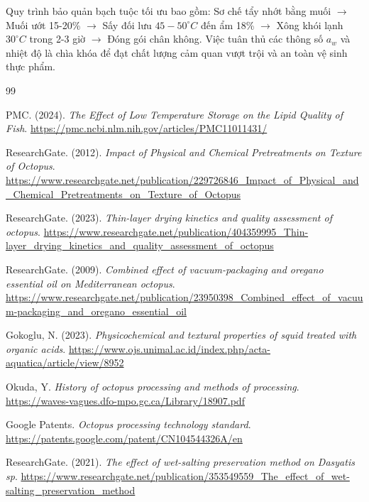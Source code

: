 \documentclass[12pt,a4paper]{report}
\begin{document}
Quy trình bảo quản bạch tuộc tối ưu bao gồm: Sơ chế tẩy nhớt bằng muối $\rightarrow$ Muối ướt 15-20\% $\rightarrow$ Sấy đối lưu $45-50^\circ C$ đến ẩm 18\% $\rightarrow$ Xông khói lạnh $30^\circ C$ trong 2-3 giờ $\rightarrow$ Đóng gói chân không. Việc tuân thủ các thông số $a_w$ và nhiệt độ là chìa khóa để đạt chất lượng cảm quan vượt trội và an toàn vệ sinh thực phẩm.

\newpage
\renewcommand{\bibname}{Tài liệu tham khảo}
\begin{thebibliography}{99}
	
	 PMC. (2024). \textit{The Effect of Low Temperature Storage on the Lipid Quality of Fish}. \url{https://pmc.ncbi.nlm.nih.gov/articles/PMC11011431/}
	
	 ResearchGate. (2012). \textit{Impact of Physical and Chemical Pretreatments on Texture of Octopus}. \url{https://www.researchgate.net/publication/229726846_Impact_of_Physical_and_Chemical_Pretreatments_on_Texture_of_Octopus}
	
	 ResearchGate. (2023). \textit{Thin-layer drying kinetics and quality assessment of octopus}. \url{https://www.researchgate.net/publication/404359995_Thin-layer_drying_kinetics_and_quality_assessment_of_octopus}
	
	 ResearchGate. (2009). \textit{Combined effect of vacuum-packaging and oregano essential oil on Mediterranean octopus}. \url{https://www.researchgate.net/publication/23950398_Combined_effect_of_vacuum-packaging_and_oregano_essential_oil}
	
	 Gokoglu, N. (2023). \textit{Physicochemical and textural properties of squid treated with organic acids}. \url{https://www.ojs.unimal.ac.id/index.php/acta-aquatica/article/view/8952}
	
	 Okuda, Y. \textit{History of octopus processing and methods of processing}. \url{https://waves-vagues.dfo-mpo.gc.ca/Library/18907.pdf}
	
	 Google Patents. \textit{Octopus processing technology standard}. \url{https://patents.google.com/patent/CN104544326A/en}
	
	 ResearchGate. (2021). \textit{The effect of wet-salting preservation method on Dasyatis sp}. \url{https://www.researchgate.net/publication/353549559_The_effect_of_wet-salting_preservation_method}
	

\end{thebibliography}
\end{document}
